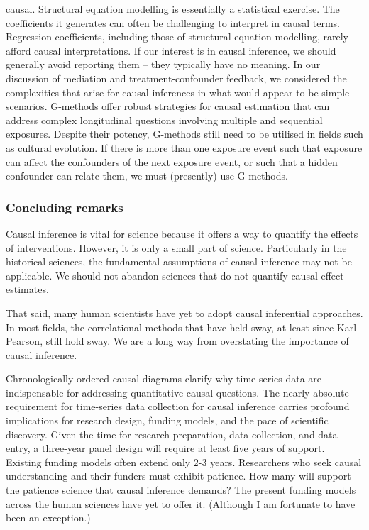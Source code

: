 \documentclass[
  singlecolumn]{article}
\begin{document}
\begin{enumerate}
  causal. Structural equation modelling is essentially a statistical
  exercise. The coefficients it generates can often be challenging to
  interpret in causal terms. Regression coefficients, including those of
  structural equation modelling, rarely afford causal interpretations.
  If our interest is in causal inference, we should generally avoid
  reporting them -- they typically have no meaning. In our discussion of
  mediation and treatment-confounder feedback, we considered the
  complexities that arise for causal inferences in what would appear to
  be simple scenarios. G-methods offer robust strategies for causal
  estimation that can address complex longitudinal questions involving
  multiple and sequential exposures. Despite their potency, G-methods
  still need to be utilised in fields such as cultural evolution. If
  there is more than one exposure event such that exposure can affect
  the confounders of the next exposure event, or such that a hidden
  confounder can relate them, we must (presently) use G-methods.
\end{enumerate}

\hypertarget{concluding-remarks}{%
\subsubsection{Concluding remarks}\label{concluding-remarks}}

Causal inference is vital for science because it offers a way to
quantify the effects of interventions. However, it is only a small part
of science. Particularly in the historical sciences, the fundamental
assumptions of causal inference may not be applicable. We should not
abandon sciences that do not quantify causal effect estimates.

That said, many human scientists have yet to adopt causal inferential
approaches. In most fields, the correlational methods that have held
sway, at least since Karl Pearson, still hold sway. We are a long way
from overstating the importance of causal inference.

Chronologically ordered causal diagrams clarify why time-series data are
indispensable for addressing quantitative causal questions. The nearly
absolute requirement for time-series data collection for causal
inference carries profound implications for research design, funding
models, and the pace of scientific discovery. Given the time for
research preparation, data collection, and data entry, a three-year
panel design will require at least five years of support. Existing
funding models often extend only 2-3 years. Researchers who seek causal
understanding and their funders must exhibit patience. How many will
support the patience science that causal inference demands? The present
funding models across the human sciences have yet to offer it. (Although
I am fortunate to have been an exception.)
\end{document}
